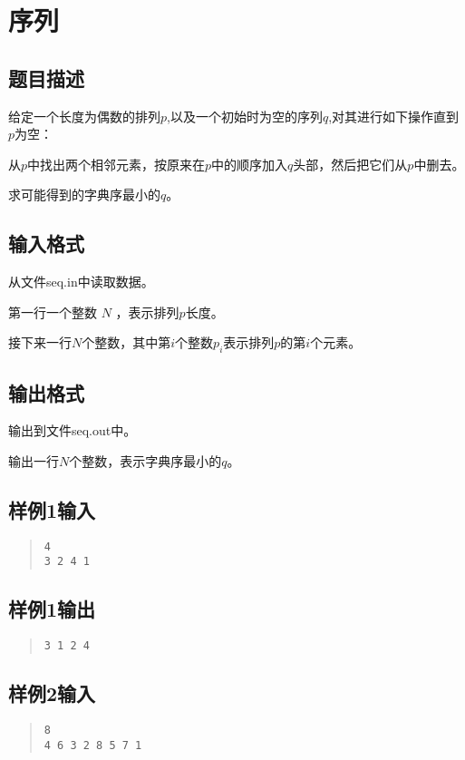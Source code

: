 ﻿\documentclass[12pt, a4paper]{article}
\begin{document}
\newpage
\section{序列}

\subsection{题目描述}

给定一个长度为偶数的排列$p$,以及一个初始时为空的序列$q$,对其进行如下操作直到$p$为空：

从$p$中找出两个相邻元素，按原来在$p$中的顺序加入$q$头部，然后把它们从$p$中删去。

求可能得到的字典序最小的$q$。

\subsection{输入格式}

从文件seq.in中读取数据。

第一行一个整数 $N$ ，表示排列$p$长度。

接下来一行$N$个整数，其中第$i$个整数$p_i$表示排列$p$的第$i$个元素。

\subsection{输出格式}

输出到文件seq.out中。

输出一行$N$个整数，表示字典序最小的$q$。

\subsection{样例1输入}
\begin{quote}
\begin{verbatim}
4
3 2 4 1
\end{verbatim}
\end{quote}
\subsection{样例1输出}
\begin{quote}
\begin{verbatim}
3 1 2 4
\end{verbatim}
\end{quote}
\subsection{样例2输入}
\begin{quote}
\begin{verbatim}
8
4 6 3 2 8 5 7 1
\end{verbatim}
\end{quote}
\end{document}
